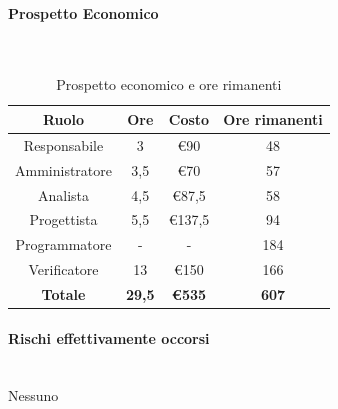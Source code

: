 \documentclass{article}
\begin{document}
                \paragraph{Prospetto Economico}\mbox{}\\
                \begin{table}[H]
                    \centering
                    \begin{tabular}{|c|c|c|c|}
                    \hline
                    \textbf{Ruolo}  & \textbf{Ore}  & \textbf{Costo} & \textbf{Ore rimanenti} \\ \hline
                    Responsabile    & 3             & €90            & 48                     \\ \hline
                    Amministratore  & 3,5           & €70            & 57                   \\ \hline
                    Analista        & 4,5           & €87,5          & 58                   \\ \hline
                    Progettista     & 5,5           & €137,5         & 94                   \\ \hline
                    Programmatore   & -            & -           & 184                    \\ \hline
                    Verificatore    & 13            & €150           & 166                    \\ \hline
                    \textbf{Totale} & \textbf{29,5} & \textbf{\euro535}   & \textbf{607}         \\ \hline
                    \end{tabular}
                    \caption{Prospetto economico e ore rimanenti}
                \end{table}


                \paragraph{Rischi effettivamente occorsi}\mbox{}\\
                Nessuno
\end{document}
